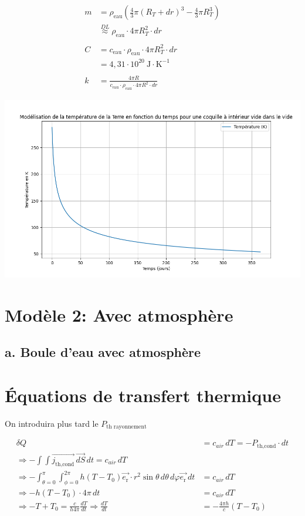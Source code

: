 \documentclass[a4paper,12pt]{article}
\begin{document}
\begin{align*}
m &= \rho_{\text{eau}} \left( \frac{4}{3} \pi (R_T + dr)^3 - \frac{4}{3} \pi R_T^3 \right) \\
&\overset{DL}{\approx} \rho_{\text{eau}} \cdot 4\pi R_T^2 \cdot dr \\
\\
C &= c_{\text{eau}} \cdot \rho_{\text{eau}} \cdot 4\pi R_T^2 \cdot dr \\
&= 4{,}31 \cdot 10^{20} \ \text{J} \cdot \text{K}^{-1} \\
\\
k &= \frac{4\pi R}{c_{\text{eau}} \cdot \rho_{\text{eau}} \cdot 4\pi R^2 \cdot dr}
\end{align*}

    \includegraphics[width=0.8\linewidth]{../figures/modele1_coquille.png} 


\section{Modèle 2: Avec atmosphère}
\subsection{a. Boule d'eau avec atmosphère }
\section*{Équations de transfert thermique}

On introduira plus tard le \(P_{\text{th rayonnement}}\)

\begin{align*}
\delta Q &= c_{air}\, dT = -P_{\text{th,cond}} \cdot dt \\
\Rightarrow -\int \int \vec{j_{\text{th,cond}}}\, \vec{dS}\,dt = c_{air}\, dT \\
\Rightarrow -\int_{\theta=0}^\pi \int_{\phi=0}^{2\pi} h(T - T_0) \vec{e_{\text{r}}}\cdot r^2 \sin\theta\, d\theta\, d\varphi \vec{e_{\text{r}}}\, dt &=  c_{air}\, dT  \\
\Rightarrow -h(T - T_0) \cdot 4\pi\, dt &= c_{air}\, dT \\
\Rightarrow -T + T_0 = \frac{c}{h 4\pi} \frac{dT}{dt} \Rightarrow \frac{dT}{dt} &= -\frac{4\pi h}{c}(T - T_0)
\end{align*}
\end{document}
